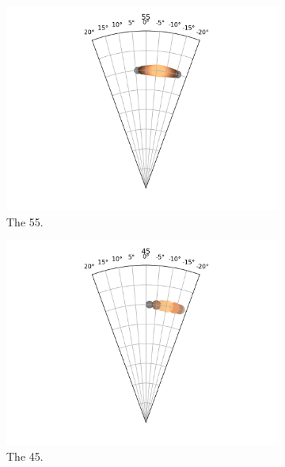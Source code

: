 \documentclass{kththesis}
\begin{document}
\begin{figure}
    \centering
    \begin{subfigure}{0.4\textwidth}
    \centering
    \includegraphics[width=\textwidth]{AgentDirectionChoices/MPDQN_Pebble_Direction_Choices_55.png} 
    \caption{The 55.}
    \label{fig:55_pebble_deviation}
    \end{subfigure}
    \begin{subfigure}{0.4\textwidth}
    \centering
    \includegraphics[width=\textwidth]{AgentDirectionChoices/MPDQN_Pebble_Direction_Choices_45.png} 
    \caption{The 45.}
    \label{fig:45_pebble_deviation}
    \end{subfigure}
    \begin{subfigure}{0.4\textwidth}

\end{subfigure}
\end{figure}
\end{document}
